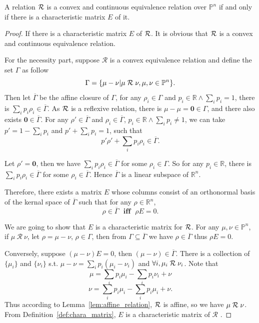 \documentclass[runningheads]{llncs}
\begin{document}
\begin{lemma}\label{lem:relation_matrix}
A relation $\mathrel{{\mathcal R }}$ is a convex and continuous equivalence relation over $\mathbb{P}^{n}$ if and only if there is a characteristic matrix $E$ of it.
\begin{proof}
If there is a characteristic matrix $E$ of $\mathrel{{\mathcal R }}$. It is obvious that $\mathrel{{\mathcal R }}$ is a convex and continuous equivalence relation.

For the necessity part, suppose $\mathcal{R}$ is a convex equivalence relation and define the set $\Gamma$ as follow
\[\Gamma = \{\mu-\nu|\mu\mathrel{{\mathcal R }}\nu, \mu,\nu\in\mathbb{P}^{n}\}.\]
Then let $\overline{\Gamma}$ be the affine closure of $\Gamma$, for any $\rho_{i}\in\Gamma$ and $p_{i}\in\mathbb{R}\wedge \sum_{i}p_{i}=1$, there is $\sum_{i}p_{i}\rho_{i}\in\overline{\Gamma}$. As $\mathrel{{\mathcal R }}$ is a reflexive relation, there is $\mu-\mu=\textbf{0}\in\Gamma$, and there also exists $\textbf{0}\in\overline{\Gamma}$. For any $\rho'\in\overline{\Gamma}$ and $\rho_{i}\in\overline{\Gamma}$,  $p_{i}\in\mathbb{R}\wedge\sum_{i}p_{i}\neq1$, we can take $p'=1-\sum_{i}p_{i}$ and $p'+\sum_{i}p_{i}=1$, such that
\[p'\rho' + \sum_{i}p_{i}\rho_{i}\in\overline{\Gamma}.\]

Let $\rho'=\textbf{0}$, then we have $\sum_{i}p_{i}\rho_{i}\in\overline{\Gamma}$ for some $\rho_{i}\in\Gamma$. So for any $p_{i}\in\mathbb{R}$, there is $\sum_{i}p_{i}\rho_{i}\in\overline{\Gamma}$ for some $\rho_{i}\in\overline{\Gamma}$. Hence $\overline{\Gamma}$ is a linear subspace of $\mathbb{R}^{n}$.

Therefore, there exists a matrix $E$ whose columns consist of an orthonormal basis of the kernal space of $\overline{\Gamma}$ such that for any $\rho\in\mathbb{R}^{n}$,
\[\rho\in\overline{\Gamma}~~~\textbf{iff}~~~\rho E=0.\]

We are going to show that $E$ is a characteristic matrix for $\mathrel{{\mathcal R }}$. For any $\mu,\nu\in\mathbb{P}^{n}$, if $\mu~\mathcal{R}~\nu$, let $\rho=\mu-\nu$, $\rho\in\Gamma$, then from $\Gamma\subseteq\overline{\Gamma}$ we have $\rho\in\overline{\Gamma}$ thus $\rho E=0$.

Conversely, suppose $(\mu-\nu)E=0$, then $(\mu-\nu)\in\overline{\Gamma}$. There is a collection of $\{\mu_{i}\}$ and $\{\nu_{i}\}$ s.t. $\mu-\nu=\sum_{i}p_{i}(\mu_{i}-\nu_{i})$ and $\forall i, \mu_{i}\mathrel{{\mathcal R }}\nu_{i}$. Note that 
\[\mu=\sum_{i}p_{i}\mu_{i}-\sum_{i}p_{i}\nu_{i}+\nu\]
\[\nu=\sum_{i}p_{i}\mu_{i}-\sum_{i}p_{i}\mu_{i}+\nu.\]
Thus according to Lemma~\ref{lem:affine_relation}, $\mathrel{{\mathcal R }}$ is affine, so we have $\mu\mathrel{{\mathcal R }}\nu$. 
From Definition~\ref{def:chara_matrix}, $E$ is a characteristic matrix of $\mathcal{R}$ .
\end{proof}
\end{lemma}
\end{document}
